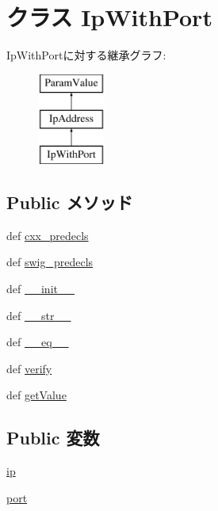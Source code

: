 \hypertarget{classm5_1_1params_1_1IpWithPort}{
\section{クラス IpWithPort}
\label{classm5_1_1params_1_1IpWithPort}
}
IpWithPortに対する継承グラフ:\begin{figure}[H]
\begin{center}
\leavevmode
\includegraphics[height=3cm]{classm5_1_1params_1_1IpWithPort}
\end{center}
\end{figure}
\subsection*{Public メソッド}
\begin{DoxyCompactItemize}
\item 
def \hyperlink{classm5_1_1params_1_1IpWithPort_a0b408a11a14bd1d770e28f71a6e14ab5}{cxx\_\-predecls}
\item 
def \hyperlink{classm5_1_1params_1_1IpWithPort_ab3dbcf5716623eac67a8ccc074fa7e13}{swig\_\-predecls}
\item 
def \hyperlink{classm5_1_1params_1_1IpWithPort_ac775ee34451fdfa742b318538164070e}{\_\-\_\-init\_\-\_\-}
\item 
def \hyperlink{classm5_1_1params_1_1IpWithPort_aa7a4b9bc0941308e362738503137460e}{\_\-\_\-str\_\-\_\-}
\item 
def \hyperlink{classm5_1_1params_1_1IpWithPort_a449f8fd74d358c0ad641b6c6d6917ba0}{\_\-\_\-eq\_\-\_\-}
\item 
def \hyperlink{classm5_1_1params_1_1IpWithPort_aea46c698f871a6aece7a52d69bd684dc}{verify}
\item 
def \hyperlink{classm5_1_1params_1_1IpWithPort_acc340fbd4335fa34f9d57fb454b28ed0}{getValue}
\end{DoxyCompactItemize}
\subsection*{Public 変数}
\begin{DoxyCompactItemize}
\item 
\hyperlink{classm5_1_1params_1_1IpWithPort_afd65cf072a93c93ad52b9f25b341e10b}{ip}
\item 
\hyperlink{classm5_1_1params_1_1IpWithPort_af8fb0f45ee0195c7422a49e6a8d72369}{port}
\end{DoxyCompactItemize}
